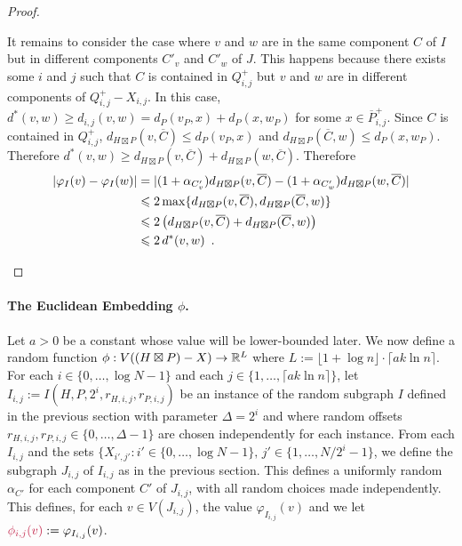 \documentclass{patmorin}
\makeatletter
\renewcommand{\ge}{\geqslant}
\renewcommand{\le}{\leqslant}
\def\mathcolor#1#{\@mathcolor{#1}}
\def\@mathcolor#1#2#3{%
  \protect\leavevmode
  \begingroup
    \color#1{#2}#3%
  \endgroup
}
\newcommand{\mathdefin}[1]{\mathcolor{brightmaroon}{#1}}
\makeatother
\begin{document}
\begin{proof}
\begin{compactenum}
    \item It remains to consider the case where $v$ and $w$ are in the same component $C$ of $I$ but in different components $C'_v$ and $C'_w$ of $J$.  This happens because there exists some $i$ and $j$ such that $C$ is contained in $Q^+_{i,j}$ but $v$ and $w$ are in different components of $Q^+_{i,j}-X_{i,j}$. In this case, $d^*(v,w)\ge d_{i,j}(v,w)=d_P(v_P,x)+d_P(x,w_P)$ for some $x\in \overline{P}^+_{i,j}$.  Since $C$ is contained in $Q^+_{i,j}$, $d_{H\boxtimes P}(v,\overline{C})\le d_{P}(v_P,x)$ and $d_{H\boxtimes P}(\overline{C},w)\le d_{P}(x,w_P)$. Therefore $d^*(v,w)\ge d_{H\boxtimes P}(v,\overline{C})+d_{H\boxtimes P}(w,\overline{C})$. Therefore
    \begin{align*}
        |\varphi_I(v)-\varphi_I(w)|
        & =|(1+\alpha_{C'_v})d_{H\boxtimes P}(v,\overline{C})-(1+\alpha_{C'_w})d_{H\boxtimes P}(w,\overline{C})| \\
        & \le 2\max\{d_{H\boxtimes P}(v,\overline{C}), d_{H\boxtimes P}(\overline{C},w)\} \\
        & \le 2\left(d_{H\boxtimes P}(v,\overline{C}) + d_{H\boxtimes P}(\overline{C},w)\right) \\
        & \le 2\, d^*(v,w) \enspace . \qedhere
    \end{align*}
  \end{compactenum}
\end{proof}


\paragraph{\boldmath The Euclidean Embedding $\phi$.}

\label{Euclidean_embedding_section}


Let $a>0$ be a constant whose value will be lower-bounded later.  We now define a random function $\phi:V((H\boxtimes P)-X)\to\mathbb{R}^{L}$ where $L:=\lfloor 1+\log n\rfloor\cdot\lceil a k\ln n\rceil$. For each $i\in\{0,\ldots,\log N-1\}$ and each $j\in\{1,\ldots,\lceil a k\ln n\rceil\}$, let $I_{i,j}:=I(H,P,2^i,r_{H,i,j},r_{P,i,j})$ be an instance of the random subgraph $I$ defined in the previous section with parameter $\Delta=2^i$ and where random offsets $r_{H,i,j},r_{P,i,j}\in\{0,\ldots,\Delta-1\}$ are chosen independently for each instance.  From each $I_{i,j}$ and the sets $\{X_{i',j'}:i'\in\{0,\ldots,\log N-1\},\, j'\in\{1,\ldots,N/2^i-1\}$, we  define the subgraph $J_{i,j}$ of $I_{i,j}$ as in the previous section.  This defines a uniformly random $\alpha_{C'}$ for each component $C'$ of $J_{i,j}$, with all random choices made independently.  This defines, for each $v\in V(J_{i,j})$, the value $\varphi_{I_{i,j}}(v)$ and we let $\mathdefin{\phi_{i,j}(v)}:= \varphi_{I_{i,j}}(v)$.
\end{document}

